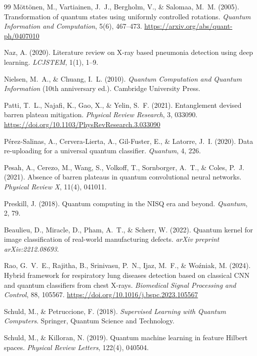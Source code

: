 \documentclass[11pt,a4paper]{article}
\begin{document}
\begin{thebibliography}{99}
M\"ott\"onen, M., Vartiainen, J.~J., Bergholm, V., \& Salomaa, M.~M. (2005).
Transformation of quantum states using uniformly controlled rotations.
\emph{Quantum Information and Computation}, 5(6), 467--473.
\url{https://arxiv.org/abs/quant-ph/0407010}

Naz, A. (2020). Literature review on X-ray based pneumonia detection using
deep learning. \emph{LCJSTEM}, 1(1), 1--9.

Nielsen, M.~A., \& Chuang, I.~L. (2010). \emph{Quantum Computation and
Quantum Information} (10th anniversary ed.). Cambridge University Press.

Patti, T.~L., Najafi, K., Gao, X., \& Yelin, S.~F. (2021). Entanglement
devised barren plateau mitigation. \emph{Physical Review Research}, 3,
033090. \url{https://doi.org/10.1103/PhysRevResearch.3.033090}

P\'erez-Salinas, A., Cervera-Lierta, A., Gil-Fuster, E., \& Latorre, J.~I.
(2020). Data re-uploading for a universal quantum classifier. \emph{Quantum},
4, 226.

Pesah, A., Cerezo, M., Wang, S., Volkoff, T., Sornborger, A.~T., \& Coles,
P.~J. (2021). Absence of barren plateaus in quantum convolutional neural
networks. \emph{Physical Review X}, 11(4), 041011.

Preskill, J. (2018). Quantum computing in the NISQ era and beyond.
\emph{Quantum}, 2, 79.

Beaulieu, D., Miracle, D., Pham, A.~T., \& Scherr, W. (2022). Quantum kernel
for image classification of real-world manufacturing defects. \emph{arXiv
preprint arXiv:2212.08693}.

Rao, G.~V.~E., Rajitha, B., Srinivasu, P.~N., Ijaz, M.~F., \& Wo\'zniak, M.
(2024). Hybrid framework for respiratory lung diseases detection based on
classical CNN and quantum classifiers from chest X-rays. \emph{Biomedical
Signal Processing and Control}, 88, 105567.
\url{https://doi.org/10.1016/j.bspc.2023.105567}

Schuld, M., \& Petruccione, F. (2018). \emph{Supervised Learning with
Quantum Computers}. Springer, Quantum Science and Technology.

Schuld, M., \& Killoran, N. (2019). Quantum machine learning in feature
Hilbert spaces. \emph{Physical Review Letters}, 122(4), 040504.


\end{thebibliography}
\end{document}
